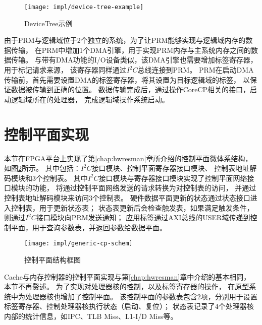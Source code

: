 \begin{figure}[htb]
  \centering
  \texttt{[image: impl/device-tree-example]}
  \caption{DeviceTree示例}
  \label{fig:device-tree-example}
\end{figure}

由于PRM与逻辑域位于2个独立的系统，为了让PRM能够实现与逻辑域内存的数据传输，
在PRM中增加1个DMA引擎，用于实现PRM内存与主系统内存之间的数据传输。
与带有DMA功能的I/O设备类似，该DMA引擎也需要增加标签寄存器，用于标记请求来源，
该寄存器同样通过$I^2C$总线连接到PRM。
PRM在启动DMA传输前，首先需要设置DMA的标签寄存器，将其设置为目标逻辑域的标签，
以保证数据被传输到正确的位置。
数据传输完成后，通过操作CoreCP相关的接口，启动逻辑域所在的处理器，
完成逻辑域操作系统启动。


\section{控制平面实现}
\label{chap:impl:cp}

本节在FPGA平台上实现了第\ref{chap:hwresman}章所介绍的控制平面微体系结构，
如图\ref{fig:generic-cp-schem}所示。
其中包括：$I^2C$接口模块、控制平面寄存器接口模块、
控制表地址解码模块和3个控制表。
其中$I^2C$接口模块与寄存器接口模块实现了控制平面网络接口模块的功能，
将通过控制平面网络发送的请求转换为对控制表的访问，
并通过控制表地址解码模块来访问3个控制表。
硬件数据平面更新的状态通过状态接口进入控制表，用于更新状态表；
状态表更新后会检查触发表，如果满足触发条件，则通过$I^2C$接口模块向PRM发送通知；
应用标签通过AXI总线的USER域传递到控制平面，用于查询参数表，并返回参数给数据平面。

\begin{figure}[tb]
  \centering
  \texttt{[image: impl/generic-cp-schem]}
  \caption{控制平面结构框图}
  \label{fig:generic-cp-schem}
\end{figure}

Cache与内存控制器的控制平面实现与第\ref{chap:hwresman}章中介绍的基本相同，
本节不再赘述。
为了实现对处理器核的控制，以及标签寄存器的操作，
在原型系统中为处理器核也增加了控制平面。
该控制平面的参数表包含2项，分别用于设置标签寄存器、控制处理器核执行状态（启动、复位）；
状态表记录了4个处理器核内部的统计信息，如IPC、TLB Miss、L1-I/D Miss等。

